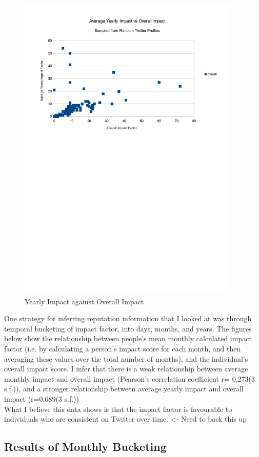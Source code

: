 \begin{figure}[h!]
\centering
\includegraphics[width=400px]{Images/yearly_impact_vs_overallv2.pdf}
\caption{Yearly Impact against Overall Impact}
\end{figure}

One strategy for inferring reputation information that I looked at was through temporal bucketing of impact factor, into days, months, and years. The figures below show the relationship between people's mean monthly calculated impact factor (i.e. by calculating a person's impact score for each month, and then averaging these values over the total number of months), and the individual's overall impact score. I infer that there is a weak relationship between average monthly impact and overall impact (Pearson's correlation coefficient r= 0.273(3 s.f.)), and a stronger relationship between average yearly impact and overall impact (r=0.689(3 s.f.))\\

\noindent What I believe this data shows is that the impact factor is favourable to individuals who are consistent on Twitter over time. <- Need to back this up

\subsection{Results of Monthly Bucketing}

